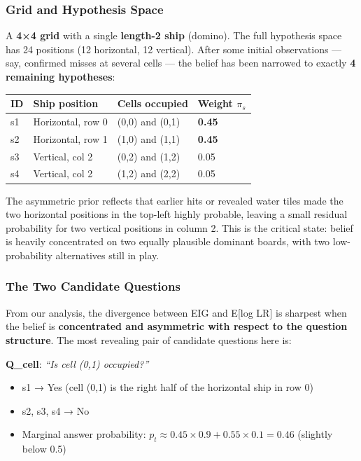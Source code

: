 \documentclass[
]{article}
\providecommand{\tightlist}{%
  \setlength{\itemsep}{0pt}\setlength{\parskip}{0pt}}
\begin{document}
\subsubsection{Grid and Hypothesis
Space}\label{grid-and-hypothesis-space}

A \textbf{4×4 grid} with a single \textbf{length-2 ship} (domino). The
full hypothesis space has 24 positions (12 horizontal, 12 vertical).
After some initial observations --- say, confirmed misses at several
cells --- the belief has been narrowed to exactly \textbf{4 remaining
hypotheses}:

\begin{longtable}[]{@{}llll@{}}
\toprule\noalign{}
ID & Ship position & Cells occupied & Weight \(\pi_s\) \\
\midrule\noalign{}
\endhead
\bottomrule\noalign{}
\endlastfoot
s1 & Horizontal, row 0 & (0,0) and (0,1) & \textbf{0.45} \\
s2 & Horizontal, row 1 & (1,0) and (1,1) & \textbf{0.45} \\
s3 & Vertical, col 2 & (0,2) and (1,2) & 0.05 \\
s4 & Vertical, col 2 & (1,2) and (2,2) & 0.05 \\
\end{longtable}

The asymmetric prior reflects that earlier hits or revealed water tiles
made the two horizontal positions in the top-left highly probable,
leaving a small residual probability for two vertical positions in
column 2. This is the critical state: belief is heavily concentrated on
two equally plausible dominant boards, with two low-probability
alternatives still in play.

\subsubsection{The Two Candidate
Questions}\label{the-two-candidate-questions}

From our analysis, the divergence between EIG and E{[}log LR{]} is
sharpest when the belief is \textbf{concentrated and asymmetric with
respect to the question structure}. The most revealing pair of candidate
questions here is:

\textbf{Q\_cell}: \emph{``Is cell (0,1) occupied?''}

\begin{itemize}
\tightlist
\item
  s1 → Yes (cell (0,1) is the right half of the horizontal ship in row
  0)
\item
  s2, s3, s4 → No
\item
  Marginal answer probability:
  \(p_t \approx 0.45 \times 0.9 + 0.55 \times 0.1 = 0.46\) (slightly
  below 0.5)
\end{itemize}
\end{document}
